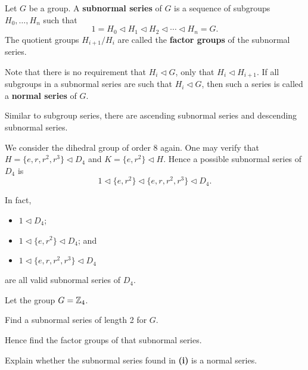 \begin{definition}
    Let $G$ be a group. A \textbf{subnormal series} of $G$ is a sequence of subgroups $H_0, \dots, H_n$ such that
    \[
        1 = H_0 \lhd H_1 \lhd H_2 \lhd \cdots \lhd H_n = G.
    \]
    The quotient groups $H_{i+1}/H_i$ are called the \textbf{factor groups} of the subnormal series.
\end{definition}
\begin{remark}
    Note that there is no requirement that $H_i \lhd G$, only that $H_i \lhd H_{i+1}$. If all subgroups in a subnormal series are such that $H_i \lhd G$, then such a series is called a \textbf{normal series} of $G$.
\end{remark}
\begin{remark}
    Similar to subgroup series, there are ascending subnormal series and descending subnormal series.
\end{remark}

\begin{example}
    We consider the dihedral group of order 8 again. One may verify that $H = \{e, r, r^2, r^3\} \lhd D_4$ and $K = \{e, r^2\} \lhd H$. Hence a possible subnormal series of $D_4$ is
    \[
        1 \lhd \{e, r^2\} \lhd \{e, r, r^2, r^3\} \lhd D_4.
    \]

    In fact,
    \begin{itemize}
        \item $1 \lhd D_4$;
        \item $1 \lhd \{e, r^2\} \lhd D_4$; and
        \item $1 \lhd \{e, r, r^2, r^3\} \lhd D_4$
    \end{itemize}
    are all valid subnormal series of $D_4$.
\end{example}

\begin{exercise}
    Let the group $G = \mathbb{Z}_4$.
    \begin{partquestions}{\roman*}
        \item Find a subnormal series of length 2 for $G$.
        \item Hence find the factor groups of that subnormal series.
        \item Explain whether the subnormal series found in \textbf{(i)} is a normal series.
    \end{partquestions}
\end{exercise}

